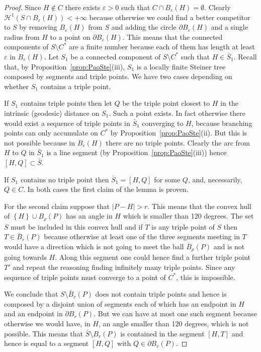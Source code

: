 \documentclass{amsart}
\renewcommand{\H}{\mathcal H}
\newcommand{\eps}{\varepsilon}
\newcommand{\abs}[1]{\left\vert #1 \right\vert}
\newcommand{\ENCLOSE}[1]{\left\{#1\right\}}
\renewcommand{\H}{\mathcal{H}}
\theoremstyle{definition}
\theoremstyle{remark}
\begin{document}
\begin{proof}
  Since $H\not \in C$ there exists $\eps>0$ such that $C\cap B_\eps(H)=\emptyset$. 
  Clearly $\H^1(S\cap B_\eps(H))<+\infty$ because otherwise we could find a better competitor
  to $S$ by removing $B_\eps(H)$ from $S$ and adding the circle $\partial B_\eps(H)$ and 
  a single radius from $H$ to a point on $\partial B_\eps(H)$.
  This means that the connected components of $S\setminus C^*$
  are a finite number because each of them has length at least $\eps$ in $B_\eps(H)$.
  Let $S_1$ be a connected component of $S\setminus C^*$ such that 
  $H\in \bar S_1$.
  Recall that, by Proposition~\ref{prop:PaoSte}(iii), $S_1$ is a locally finite Steiner tree 
  composed by segments and triple points.
  We have two cases depending on whether $S_1$ contains a triple point.
  
  If $S_1$ contains triple points
  then let $Q$ be the triple point closest to $H$
  in the intrinsic (geodesic) distance on $S_1$.
  Such a point exists. 
  In fact otherwise there would exist a sequence of 
  triple points in $\bar S_1$ converging to $H$,
  because branching points can only accumulate on $C^*$ 
  by Proposition~\ref{prop:PaoSte}(ii).
  But this is not possible because in $B_\eps(H)$ there are no triple points.
  Clearly the arc from $H$ to $Q$ in $\bar S_1$ is a line segment 
  (by Proposition~\ref{prop:PaoSte}(iii)) hence $[H,Q]\subset \bar S$.

  If $S_1$ contains no triple point then $\bar S_1 =[H,Q]$ for some $Q$, 
  and, necessarily, $Q\in C$. 
  In both cases the first claim of the lemma is proven.

  For the second claim suppose that $\abs{P-H}> r$. 
  This means that the convex hull of $\ENCLOSE{H}\cup B_\rho(P)$ has an angle in 
  $H$ which is smaller than 120 degrees.
  The set $S$ must be included in this convex hull  
  and if $T$ is any triple point of $S$ then $T\in \bar B_r(P)$ because 
  otherwise at least one of the three segments meeting in $T$ would have a direction 
  which is not going to meet the ball $\bar B_\rho(P)$ and is not going towards 
  $H$. Along this segment one could hence find a further triple point $T'$ and repeat 
  the reasoning finding infinitely many triple points. 
  Since any sequence of triple points must converge to a point 
  of $C^*$, this is impossible.

  We conclude that $S\setminus \bar B_r(P)$ does not contain triple points and 
  hence is composed by a disjoint union of segments each of which has an endpoint in $H$
  and an endpoint in $\partial B_r(P)$. 
  But we can have at most one such segment because otherwise we would have, in $H$, an angle 
  smaller than 120 degrees, which is not possible.
  This means that $\bar S \setminus B_r(P)$ is contained in the segment $[H,T]$ and hence 
  is equal to a segment $[H,Q]$ with $Q \in \partial B_r(P)$.
\end{proof}
\end{document}
